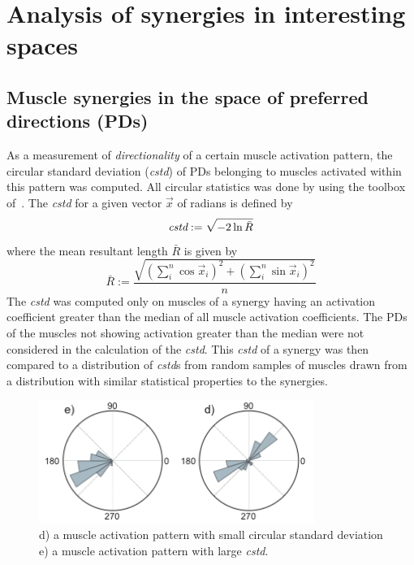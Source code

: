 





\section{Analysis of synergies in interesting spaces} %
\label{sg:sec:syn_comp}


\subsection{Muscle synergies in the space of preferred directions (PDs)} %
\label{sg:sub:pd}

As a measurement of \emph{directionality} of a certain muscle activation pattern, the circular standard deviation (\emph{cstd}) of PDs belonging to muscles activated within this pattern was computed. All circular statistics was done by using the toolbox of~\citet{Velasco:2009p5150}. The \emph{cstd} for a given vector $\vec{x}$ of radians is defined by 
\begin{equation}
	\emph{cstd} := \sqrt{-2 \ln{\bar{R}}}
\end{equation}
where the mean resultant length $\bar{R}$ is given by 
\begin{equation}
	\bar{R} := \frac
					{ \sqrt{ {(\sum_{i}^n \cos  \vec{x}_i)}^2 + {(\sum_{i}^n \sin \vec{x}_i)}^2 }}
					{n}
\end{equation}
The \emph{cstd} was computed only on muscles of a synergy having an activation coefficient greater than the median of all muscle activation coefficients. The PDs of the muscles not showing activation greater than the median were not considered in the calculation of the \emph{cstd}. This \emph{cstd} of a synergy was then compared to a distribution of \emph{cstd}s from random samples of muscles drawn from a distribution with similar statistical properties to the synergies.


\begin{figure}[ht]
	\centering
		\includegraphics[width=0.8\textwidth]{images/cstd.jpg}
	\caption
	{
	d) a muscle activation pattern with small circular standard deviation \\
	e) a muscle activation pattern with large \emph{cstd}.
	}
	\label{sg:fig:images_cstd}
\end{figure}


